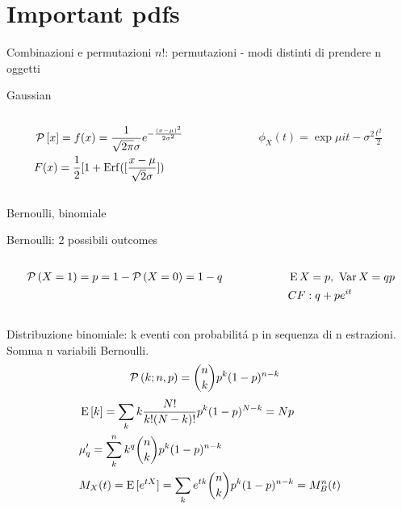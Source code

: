 \section{Important pdfs}

\begin{wordonframe}{Combinazioni e permutazioni}
$n!$: permutazioni - modi distinti di prendere n oggetti
\end{wordonframe}

\begin{frame}{Gaussian}
\begin{columns}[T]
\begin{column}{0.5\textwidth}
\begin{align*}
&\operatorname{\mathcal{P}}{[x]}=f(x)=\frac{1}{\sqrt{2\pi}\sigma}e^{-\frac{(x-\mu)^2}{2\sigma^2}}\\
&F(x)=\frac{1}{2}[1+\operatorname{Erf}([\frac{x-\mu}{\sqrt{2}\sigma}])
\end{align*}
\end{column}
\begin{column}{0.5\textwidth}
\begin{align*}
\phi_X(t)=\exp{\mu it-\sigma^2\frac{t^2}{2}}
\end{align*}
\end{column}
\end{columns}
\end{frame}

\begin{frame}{Bernoulli, binomiale}
\begin{block}{Bernoulli: 2 possibili outcomes}
	\begin{columns}[T]
	\begin{column}{0.5\textwidth}
	\begin{align*}
	&\operatorname{\mathcal{P}}{(X=1)}=p=1-\operatorname{\mathcal{P}}{(X=0)}=1-q
	\end{align*}
	\end{column}
	\begin{column}{0.5\textwidth}
	\begin{align*}
	&\operatorname{E}{X}=p,\ \operatorname{Var}{X}=qp\\
	&CF: q+pe^{it}
	\end{align*}
	\end{column}
	\end{columns}
\end{block}
\begin{block}{Distribuzione binomiale: k eventi con probabilit\'a p in sequenza di n estrazioni. Somma n variabili Bernoulli.}
\begin{align*}
&\operatorname{\mathcal{P}}{(k;n,p)}=\binom{n}{k}p^k(1-p)^{n-k}
\end{align*}
\begin{align*}
&\operatorname{E}{[k]}=\sum_kk\frac{N!}{k!(N-k)!}p^k(1-p)^{N-k}=Np\\
&\mu'_q=\sum_k^nk^q\binom{n}{k}p^k(1-p)^{n-k}\\
&M_X(t)=\operatorname{E}{[e^{tX}]}=\sum_ke^{tk}\binom{n}{k}p^k(1-p)^{n-k}=M_B^n(t)
\end{align*}
\end{block}
\end{frame}

